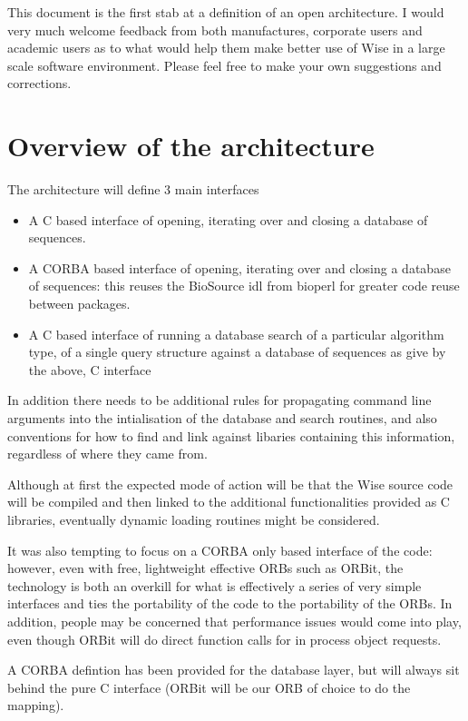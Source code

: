 This document is the first stab at a definition of an open architecture. I would
very much welcome feedback from both manufactures, corporate users and academic
users as to what would help them make better use of Wise in a large scale software
environment. Please feel free to make your own suggestions and corrections.

\section{Overview of the architecture}

The architecture will define 3 main interfaces

\begin{itemize}
\item A C based interface of opening, iterating over and closing a database
of sequences.
\item A CORBA based interface of opening, iterating over and closing a database
of sequences: this reuses the BioSource idl from bioperl for greater code reuse
between packages.
\item A C based interface of running a database search of a particular algorithm
type, of a single query structure against a database of sequences as give by
the above, C interface
\end{itemize}

In addition there needs to be additional rules for propagating command line
arguments into the intialisation of the database and search routines, and also
conventions for how to find and link against libaries containing this information,
regardless of where they came from.

Although at first the expected mode of action will be that the Wise source code
will be compiled and then linked to the additional functionalities provided as
C libraries, eventually dynamic loading routines might be considered.

It was also tempting to focus on a CORBA only based interface of the
code: however, even with free, lightweight effective ORBs such as
ORBit, the technology is both an overkill for what is effectively a
series of very simple interfaces and ties the portability of the code
to the portability of the ORBs. In addition, people may be concerned
that performance issues would come into play, even though ORBit will
do direct function calls for in process object requests.

A CORBA defintion has been provided for the database layer, but will 
always sit behind the pure C interface (ORBit will be our ORB of choice
to do the mapping).

